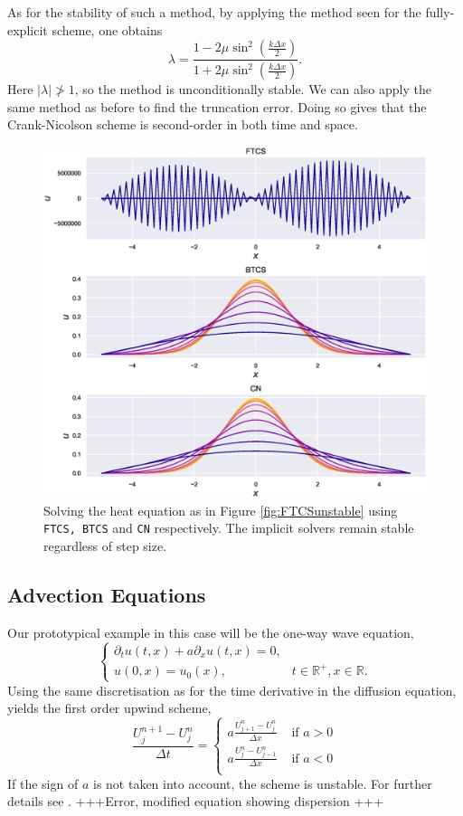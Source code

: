 \documentclass[11pt, a4paper, draft]{article}
\renewcommand{\R}{\mathbb{R}}
\newcommand{\Dt}{\Delta t}
\newcommand{\Dx}{\Delta x}
\begin{document}
        As for the stability of such a method, by applying the method seen for the fully-explicit scheme, one obtains 
        \[
            \lambda = \frac{1-2\mu\sin^2\left(\frac{k\Dx}{2}\right)}{1+2\mu\sin^2\left(\frac{k\Dx}{2}\right)}.
        \]
        Here $|\lambda| \not> 1$, so the method is unconditionally stable. We can also apply the same method as before to find the truncation error. Doing so gives that the Crank-Nicolson scheme is second-order in both time and space.
        \begin{figure}
            \centering
            \includegraphics[width=0.7\linewidth]{Figures/FTCSandCN}
            \caption{Solving the heat equation as in Figure \ref{fig:FTCSunstable} using \texttt{FTCS, BTCS} and \texttt{CN} respectively. The implicit solvers remain stable regardless of step size.}
            \label{fig:ftcsandcn}
        \end{figure}
        
        \subsection{Advection Equations}
        Our prototypical example in this case will be the one-way wave equation,
        \begin{equation}\begin{cases}
            \partial_t u(t,x) + a\partial_x u(t,x)=0,\\
            u(0,x) = u_0(x),  &t\in\R^+, x\in\R.
        \end{cases}\label{eq:wave}\end{equation}
        Using the same discretisation as for the time derivative in the diffusion equation, yields the first order upwind scheme,
        \[
            \frac{U^{n+1}_{j}-U^{n}_{j}}{\Dt} = \begin{cases} a\frac{U^{n}_{j+1}-U^{n}_{j}}{\Dx} & \text{ if } a>0\\[0.5em]
                                                              a\frac{U^{n}_{j}-U^{n}_{j-1}}{\Dx} & \text{ if } a<0\\
                                                \end{cases}
        \]
        If the sign of \(a\) is not taken into account, the scheme is unstable. For further details see \cite{Hundsdorfer2007}.
        +++Error, modified equation showing dispersion +++
        
\end{document}
